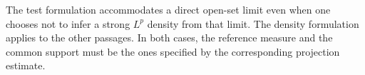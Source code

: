 The test formulation accommodates a direct open-set limit even when
one chooses not to infer a strong \(L^p\) density from that limit.
The density formulation applies to the other passages. In both cases,
the reference measure and the common support must be the ones
specified by the corresponding projection estimate.
